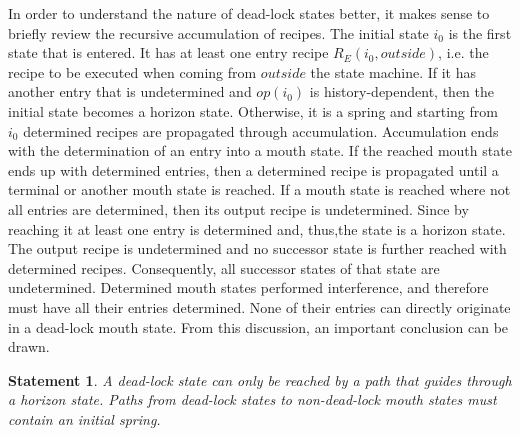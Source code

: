 \documentclass[12pt,a4paper]{scrartcl}
\newtheorem{statement}{Statement}
\begin{document}
In order to understand the nature of dead-lock states better, it makes sense to
briefly review the recursive accumulation of recipes. The initial state $i_0$
is the first state that is entered. It has at least one entry recipe
$R_E(i_0,outside)$, i.e. the recipe to be executed when coming from $outside$
the state machine. If it has another entry that is undetermined and $op(i_0)$
is history-dependent, then the initial state becomes a horizon state.  Otherwise, it
is a spring and starting from $i_0$ determined recipes are propagated through
accumulation.  Accumulation ends with the determination of an entry into a
mouth state. If the reached mouth state ends up with determined entries, then a
determined recipe is propagated until a terminal or another mouth state is
reached. If a mouth state is reached where not all entries are determined, then
its output recipe is undetermined. Since by reaching it at least one entry is
determined and, thus,the state is a horizon state. The output recipe is
undetermined and no successor state is further reached with determined recipes.
Consequently, all successor states of that state are undetermined.  Determined
mouth states performed interference, and therefore must have all their entries
determined.  None of their entries can directly originate in a dead-lock mouth
state. From this discussion, an important conclusion can be drawn.  

\begin{statement} \label{stm:dead-lock-horizon}
A dead-lock state can only be reached by a path that guides through a horizon
state.  Paths from dead-lock states to non-dead-lock mouth states must contain
an initial spring.  
\end{statement}
\end{document}
